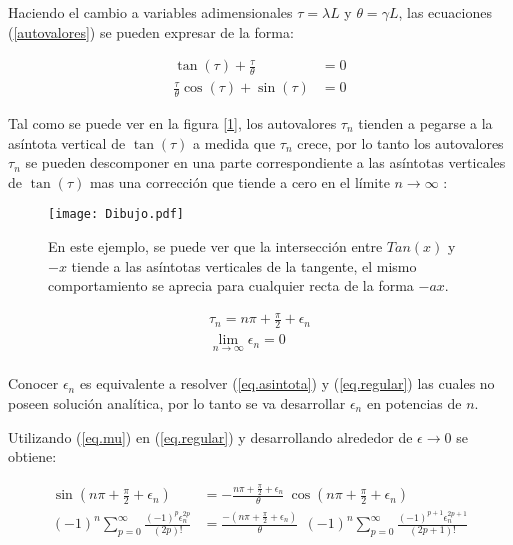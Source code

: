 Haciendo el cambio a variables adimensionales $\tau = \lambda L $ y $\theta = \gamma L $, las ecuaciones (\ref{autovalores}) se pueden expresar de la forma:

\begin{align}
    \tan (\tau) + \frac{\tau}{\theta} &= 0 \label{eq.asintota} \\[5pt]
    \frac{\tau}{\theta} \cos( \tau ) + \sin( \tau ) &= 0 \label{eq.regular}
\end{align}



Tal como se puede ver en la figura [\ref{fig:Dibujo1}], los autovalores $\tau _n$ tienden a pegarse a la asíntota vertical de $ \tan ( \tau ) $ a medida que $\tau _n$ crece, por lo tanto los autovalores $\tau _n$ se pueden descomponer en una parte correspondiente a las asíntotas verticales de $ \tan ( \tau )$ mas una corrección que tiende a cero en el límite $ n  \rightarrow \infty$ :

\begin{figure}
    \centering
    \texttt{[image: Dibujo.pdf]}
    \caption{En este ejemplo, se puede ver que la intersección entre $Tan(x)$ y $-x$ tiende a las asíntotas verticales de la tangente, el mismo comportamiento se aprecia para cualquier recta de la forma $- a x$.}
    \label{fig:Dibujo1}
\end{figure}

\begin{equation}
\begin{array}{c}
    \tau _n = n \pi + \frac{\pi}{2} + \epsilon _n \\[5pt]
    \lim \limits_{ n \rightarrow \infty} \epsilon _n = 0 \\
    
\end{array}
\label{eq.mu}
\end{equation}


Conocer $\epsilon _n $ es equivalente a resolver (\ref{eq.asintota}) y (\ref{eq.regular}) las cuales no poseen solución analítica, por lo tanto se va desarrollar $\epsilon _n $ en potencias de $n$.

Utilizando (\ref{eq.mu}) en (\ref{eq.regular}) y desarrollando alrededor de $\epsilon \rightarrow{0}$ se obtiene:

\begin{equation}
\begin{aligned}
    \sin \left( n \pi + \frac{\pi}{2} + \epsilon _n \right) &= 
    - \frac{n \pi + \frac{\pi}{2} + \epsilon _n}{\theta}  \ \cos \left( n \pi + \frac{\pi}{2} + \epsilon _n \right)  \\
         (-1) ^n \sum _{p=0} ^{\infty} \frac{(-1) ^p  \epsilon _n ^{2 p }}{(2p)!} 
    &=  \frac{-(n \pi + \frac{\pi}{2} + \epsilon _n) }{\theta}  \  \	
    (-1) ^n
     \sum _{p=0} ^{\infty} \frac{(-1) ^ {p+1} \epsilon _n ^{2 p + 1}}{(2p+1)!} 
\end{aligned}
\end{equation}


